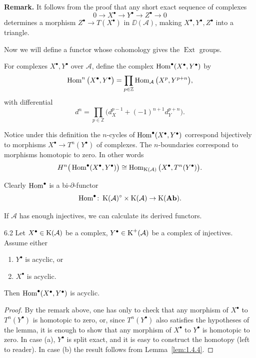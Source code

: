 \textbf{Remark.}
It follows from the proof that any short exact sequence of complexes
\[
0 \to X^\bullet \to Y^\bullet \to Z^\bullet \to 0
\]
determines a morphism $Z^\bullet\to T(X^\bullet)$ in $\DD(\mathcal{A})$, making $X^\bullet,Y^\bullet,Z^\bullet$
into a triangle.

Now we will define a functor whose cohomology gives the  $\operatorname{Ext}$ groups.

\begin{definition*}
For complexes $X^\bullet,Y^\bullet$ over $\mathcal{A}$, define the complex
$\operatorname{Hom}^\bullet(X^\bullet,Y^\bullet)$ by
\[
\operatorname{Hom}^n\big(X^\bullet,Y^\bullet\big)
= \prod_{p\in\mathbb{Z}} \operatorname{Hom}_{\mathcal{A}}\big(X^p,Y^{p+n}\big),
\]
with differential
\[
d^n = \prod_{p\in\mathbb{Z}} \big(d_X^{p-1} + (-1)^{n+1}d_Y^{p+n}\big).
\]

Notice under this definition the $n$-cycles of $\operatorname{Hom}^\bullet(X^\bullet,Y^\bullet)$ correspond bijectively
to morphisms $X^\bullet\to T^n(Y^\bullet)$ of complexes.
The $n$-boundaries correspond to morphisms homotopic to zero.
In other words
\[
H^n\big(\operatorname{Hom}^\bullet(X^\bullet,Y^\bullet)\big)
\cong \operatorname{Hom}_{\operatorname{K}(\mathcal{A})}\big(X^\bullet, T^n(Y^\bullet)\big).
\]

Clearly $\operatorname{Hom}^\bullet$ is a bi-$\partial$-functor
\[
\operatorname{Hom}^\bullet\colon\operatorname{K}(\mathcal{A})^\circ \times \operatorname{K}(\mathcal{A}) \to \operatorname{K}(\mathbf{Ab}).
\]
\end{definition*}

If $\mathcal{A}$ has enough injectives, we can calculate its derived   functors.

\begin{booklemma}{6.2}\label{lem:1.6.2}
Let $X^\bullet\in\operatorname{K}(\mathcal{A})$ be a complex, $Y^\bullet\in\operatorname{K}^+(\mathcal{A})$ be a complex of injectives.
Assume either
\begin{enumerate}
\item[(a)] $Y^\bullet$ is acyclic, or
\item[(b)] $X^\bullet$ is acyclic.
\end{enumerate}
Then $\operatorname{Hom}^\bullet(X^\bullet,Y^\bullet)$ is acyclic.
\end{booklemma}

\begin{proof}
By the remark above, one has only to check that any morphism of $X^\bullet$ to $T^n(Y^\bullet)$ is homotopic to zero, or, since $T^n(Y^\bullet)$ also satisfies the hypotheses of the lemma, it is enough to show that any morphism of $X^\bullet$ to $Y^\bullet$ is homotopic to zero.
In case (a), $Y^\bullet$ is split exact, and it is easy to construct the homotopy (left to reader).
In case (b) the result follows from Lemma~\ref{lem:1.4.4}.
\end{proof}

